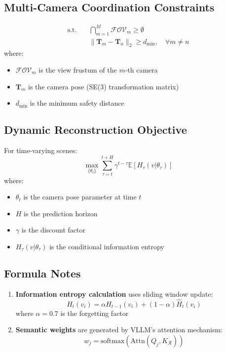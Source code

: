 \subsection{Multi-Camera Coordination Constraints}
\begin{equation}
	\begin{aligned}
		\text{s.t.} \quad & \bigcap_{m=1}^M \mathcal{FOV}_m \geq \emptyset \\
		& \|\mathbf{T}_m - \mathbf{T}_n\|_2 \geq d_{\text{min}}, \quad \forall m \neq n
	\end{aligned}
\end{equation}
where:
\begin{itemize}
	\item $\mathcal{FOV}_m$ is the view frustum of the $m$-th camera
	\item $\mathbf{T}_m$ is the camera pose (SE(3) transformation matrix)
	\item $d_{\text{min}}$ is the minimum safety distance
\end{itemize}

\subsection{Dynamic Reconstruction Objective}
For time-varying scenes:
\begin{equation}
	\max_{\{\theta_t\}} \sum_{\tau=t}^{t+H} \gamma^{t-\tau} \mathbb{E}[H_{\tau}(v|\theta_\tau)]
\end{equation}
where:
\begin{itemize}
	\item $\theta_t$ is the camera pose parameter at time $t$
	\item $H$ is the prediction horizon
	\item $\gamma$ is the discount factor
	\item $H_{\tau}(v|\theta_\tau)$ is the conditional information entropy
\end{itemize}

\subsection{Formula Notes}
\begin{enumerate}
	\item \textbf{Information entropy calculation} uses sliding window update:
	\begin{equation}
		H_t(v_i) = \alpha H_{t-1}(v_i) + (1-\alpha)\hat{H}_t(v_i)
	\end{equation}
	where $\alpha=0.7$ is the forgetting factor
	
	\item \textbf{Semantic weights} are generated by VLLM's attention mechanism:
	\begin{equation}
		w_j = \text{softmax}(\text{Attn}(Q_j, K_{\mathcal{R}}))
	\end{equation}
\end{enumerate}

